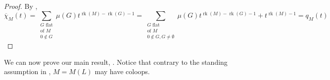 \documentclass[12pt,a4paper,english]{scrartcl}
\DeclareMathOperator{\rank}{rk}
\DeclareMathOperator{\Lattice}{L}
\begin{document}
\begin{proof}
By \cite[Corollary 7.2.7]{WhiteCombGeo1987}, 
\[
\overline{\chi}_M(t) = \sum_{\substack{G \text{ flat} \\ \text{of } M \\ 0 \notin G}} \mu(G) t^{\rank(M) - \rank(G) - 1} = \sum_{\substack{G \text{ flat} \\ \text{of } M \\ 0 \notin G, G \neq \emptyset}} \mu(G) t^{\rank(M) - \rank(G) - 1} + t^{\rank(M)-1}=q_M(t)
\]

\end{proof}



We can now prove our main result, . Notice that contrary to the standing assumption in , $M=M(L)$ may have coloops.
\end{document}
